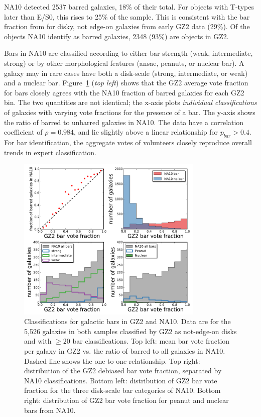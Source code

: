 \documentclass[useAMS,usenatbib]{mn2e}
\begin{document}
NA10 detected 2537 barred galaxies, 18\% of their total. For objects with T-types later than E/S0, this rises to 25\% of the sample. This is consistent with the bar fraction from \citep{mas11c} for disky, not edge-on galaxies from early GZ2 data (29\%). Of the objects NA10 identify as barred galaxies, 2348 (93\%) are objects in GZ2. 

Bars in NA10 are classified according to either bar strength (weak, intermediate, strong) or by other morphological features (ansae, peanuts, or nuclear bar). A galaxy may in rare cases have both a disk-scale (strong, intermediate, or weak) and a nuclear bar. Figure~\ref{fig-na_bars} ({\it top left}) shows that the GZ2 average vote fraction for bars closely agrees with the NA10 fraction of barred galaxies for each GZ2 bin. The two quantities are not identical; the x-axis plots {\it individual classifications} of galaxies with varying vote fractions for the presence of a bar. The y-axis shows the ratio of barred to unbarred galaxies in NA10. The data have a correlation coefficient of $\rho=0.984$, and lie slightly above a linear relationship for $p_{bar}>0.4$. For bar identification, the aggregate votes of volunteers closely reproduce overall trends in expert classification. 

\begin{figure}
\includegraphics[angle=0,width=3.5in]{figures/na_bars.pdf}
\caption{Classifications for galactic bars in GZ2 and NA10. Data are for the 5,526 galaxies in both samples classified by GZ2 as not-edge-on disks and with $\geq20$ bar classifications. Top left: mean bar vote fraction per galaxy in GZ2 vs. the ratio of barred to all galaxies in NA10. Dashed line shows the one-to-one relationship. Top right: distribution of the GZ2 debiased bar vote fraction, separated by NA10 classifications. Bottom left: distribution of GZ2 bar vote fraction for the three disk-scale bar categories of NA10. Bottom right: distribution of GZ2 bar vote fraction for peanut and nuclear bars from NA10. 
\label{fig-na_bars}}
\end{figure}
\end{document}
